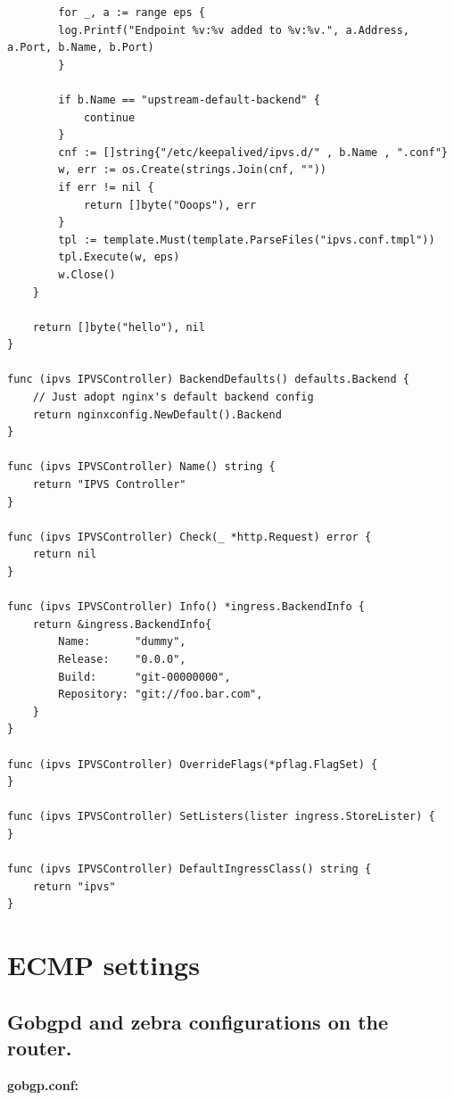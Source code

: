 \begin{lstlisting}
		for _, a := range eps {
		log.Printf("Endpoint %v:%v added to %v:%v.", a.Address, a.Port, b.Name, b.Port)
		}

		if b.Name == "upstream-default-backend" {
			continue
		}
		cnf := []string{"/etc/keepalived/ipvs.d/" , b.Name , ".conf"}
		w, err := os.Create(strings.Join(cnf, ""))
		if err != nil {
			return []byte("Ooops"), err
		}
		tpl := template.Must(template.ParseFiles("ipvs.conf.tmpl"))
		tpl.Execute(w, eps)
		w.Close()
	}
	
	return []byte("hello"), nil
}

func (ipvs IPVSController) BackendDefaults() defaults.Backend {
	// Just adopt nginx's default backend config
	return nginxconfig.NewDefault().Backend
}

func (ipvs IPVSController) Name() string {
	return "IPVS Controller"
}

func (ipvs IPVSController) Check(_ *http.Request) error {
	return nil
}

func (ipvs IPVSController) Info() *ingress.BackendInfo {
	return &ingress.BackendInfo{
		Name:       "dummy",
		Release:    "0.0.0",
		Build:      "git-00000000",
		Repository: "git://foo.bar.com",
	}
}

func (ipvs IPVSController) OverrideFlags(*pflag.FlagSet) {
}

func (ipvs IPVSController) SetListers(lister ingress.StoreLister) {
}

func (ipvs IPVSController) DefaultIngressClass() string {
	return "ipvs"
}
\end{lstlisting}

\chapter{ECMP settings}


\section{Gobgpd and zebra configurations on the router.}

{\bf\normalsize gobgp.conf:}

